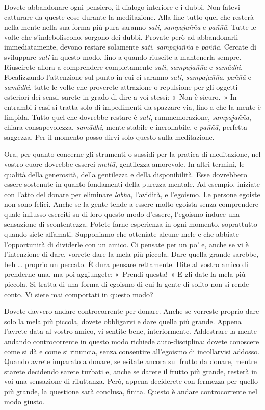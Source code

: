Dovete abbandonare ogni pensiero, il dialogo interiore e i dubbi. Non
fatevi catturare da queste cose durante la meditazione. Alla fine tutto
quel che resterà nella mente nella sua forma più pura saranno
\emph{sati}, \emph{sampajañña} e \emph{paññā}. Tutte le volte che
s'indeboliscono, sorgono dei dubbi. Provate però ad abbandonarli
immediatamente, devono restare solamente \emph{sati}, \emph{sampajañña}
e \emph{paññā}. Cercate di sviluppare \emph{sati} in questo modo, fino a
quando riuscite a mantenerla sempre. Riuscirete allora a comprendere
completamente \emph{sati}, \emph{sampajañña} e \emph{samādhi}.
Focalizzando l'attenzione sul punto in cui ci saranno \emph{sati},
\emph{sampajañña}, \emph{paññā} e \emph{samādhi}, tutte le volte che
proverete attrazione o repulsione per gli oggetti esteriori dei sensi,
sarete in grado di dire a voi stessi: «~Non è sicuro.~» In entrambi i
casi si tratta solo di impedimenti da spazzare via, fino a che la mente
è limpida. Tutto quel che dovrebbe restare è \emph{sati},
rammemorazione, \emph{sampajañña}, chiara consapevolezza,
\emph{samādhi}, mente stabile e incrollabile, e \emph{paññā}, perfetta
saggezza. Per il momento posso dirvi solo questo sulla meditazione.

Ora, per quanto concerne gli strumenti o sussidi per la pratica di
meditazione, nel vostro cuore dovrebbe esserci \emph{mettā}, gentilezza
amorevole. In altri termini, le qualità della generosità, della
gentilezza e della disponibilità. Esse dovrebbero essere sostenute in
quanto fondamenti della purezza mentale. Ad esempio, iniziate con l'atto
del donare per eliminare \emph{lobha}, l'avidità, e l'egoismo. Le
persone egoiste non sono felici. Anche se la gente tende a essere molto
egoista senza comprendere quale influsso eserciti su di loro questo modo
d'essere, l'egoismo induce una sensazione di scontentezza. Potete farne
esperienza in ogni momento, soprattutto quando siete affamati.
Supponiamo che otteniate alcune mele e che abbiate l'opportunità di
dividerle con un amico. Ci pensate per un po' e, anche se vi è
l'intenzione di dare, vorrete dare la mela più piccola. Dare quella
grande sarebbe, beh \ldots{} proprio un peccato. È dura pensare rettamente.
Dite al vostro amico di prenderne una, ma poi aggiungete: «~Prendi
questa!~» E gli date la mela più piccola. Si tratta di una forma di
egoismo di cui la gente di solito non si rende conto. Vi siete mai
comportati in questo modo?

Dovete davvero andare controcorrente per donare. Anche se vorreste
proprio dare solo la mela più piccola, dovete obbligarvi e dare quella
più grande. Appena l'avrete data al vostro amico, vi sentite bene,
interiormente. Addestrare la mente andando controcorrente in questo modo
richiede auto-disciplina: dovete conoscere come si dà e come si
rinuncia, senza consentire all'egoismo di incollarvisi addosso. Quando
avrete imparato a donare, se esitate ancora sul frutto da donare, mentre
starete decidendo sarete turbati e, anche se darete il frutto più
grande, resterà in voi una sensazione di riluttanza. Però, appena
deciderete con fermezza per quello più grande, la questione sarà
conclusa, finita. Questo è andare controcorrente nel modo giusto.

